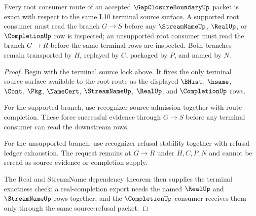 \begin{theorem}
\label{thm:gap-closure-boundary-root-consumer-exactness}
Every root consumer route of an accepted $\GapClosureBoundaryUp$ packet is exact with respect to the same L10 terminal source surface. A supported root consumer must read the branch $G \longrightarrow S$ before any $\StreamNameUp$, $\RealUp$, or $\CompletionUp$ row is inspected; an unsupported root consumer must read the branch $G \longrightarrow R$ before the same terminal rows are inspected. Both branches remain transported by $H$, replayed by $C$, packaged by $P$, and named by $N$.
\end{theorem}
\begin{proof}
Begin with the terminal source lock above. It fixes the only terminal source surface available to the root route as the displayed $\BHist$, $\hsame$, $\Cont$, $\Pkg$, $\NameCert$, $\StreamNameUp$, $\RealUp$, and $\CompletionUp$ rows.

For the supported branch, use recognizer source admission together with route completion. These force successful evidence through $G \longrightarrow S$ before any terminal consumer can read the downstream rows.

For the unsupported branch, use recognizer refusal stability together with refusal ledger exhaustion. The request remains at $G \longrightarrow R$ under $H,C,P,N$ and cannot be reread as source evidence or completion supply.

The Real and StreamName dependency theorem then supplies the terminal exactness check: a real-completion export needs the named $\RealUp$ and $\StreamNameUp$ rows together, and the $\CompletionUp$ consumer receives them only through the same source-refusal packet.
\end{proof}

